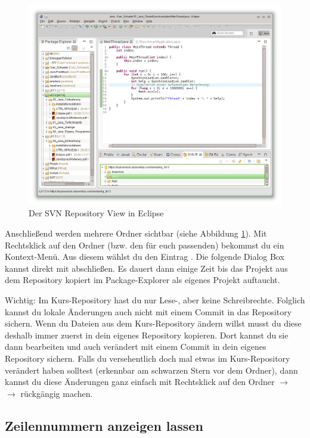 \begin{figure}[h]
  \centering
   \includegraphics[width=1.0\textwidth]{./inf/SEKII/01_Vorbereitung/Eclipse_Repository-View.png}
   \caption{Der SVN Repository View in Eclipse}
   \label{fig:eclipse-repository-view}
\end{figure}

Anschließend werden mehrere Ordner sichtbar (siehe Abbildung
\ref{fig:eclipse-repository-view}). Mit Rechtsklick auf den Ordner 
(bzw. den für euch passenden) bekommst du ein Kontext-Menü. Aus diesem wählst du
den Eintrag . Die folgende Dialog Box kannst direkt mit
 abschließen. Es dauert dann einige Zeit bis das Projekt aus dem
Repository kopiert im Package-Explorer als eigenes Projekt auftaucht.

Wichtig: Im Kurs-Repository hast du nur Lese-, aber keine Schreibrechte.
Folglich kannst du lokale Änderungen auch nicht mit einem Commit in das
Repository sichern. Wenn du Dateien aus dem Kurs-Repository ändern willst musst
du diese deshalb immer zuerst in dein eigenes Repository kopieren. Dort kannst
du sie dann bearbeiten und auch verändert mit einem Commit in dein eigenes
Repository sichern. Falls du versehentlich doch mal etwas im Kurs-Repository
verändert haben solltest (erkennbar am schwarzen Stern vor dem Ordner), dann
kannst du diese Änderungen ganz einfach mit Rechtsklick auf den
Ordner $\rightarrow$  $\rightarrow$  rückgängig
machen.


\subsection{Zeilennummern anzeigen lassen}

